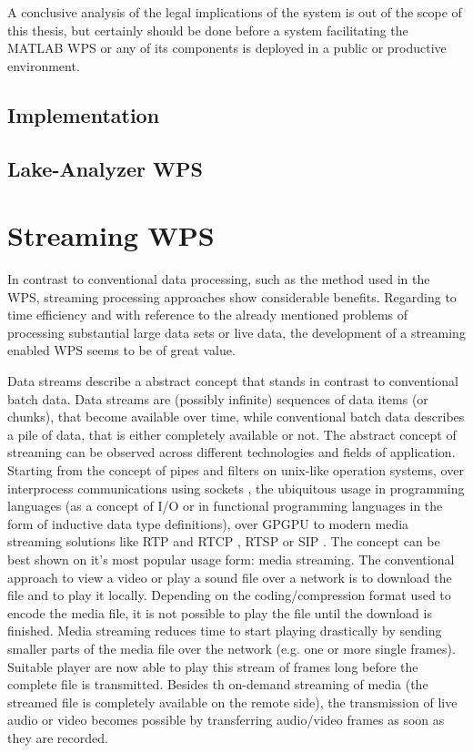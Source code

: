 		A conclusive analysis of the legal implications of the system is out of the scope of this thesis, but certainly should be done before a system facilitating the MATLAB WPS or any of its components is deployed in a public or productive environment.
	\section{Implementation}

	\section{Lake-Analyzer WPS}
\chapter{Streaming WPS}
	In contrast to conventional data processing, such as the method used in the \ac{WPS}, streaming processing approaches show considerable benefits. Regarding to time efficiency and with reference to the already mentioned problems of processing substantial large data sets or live data, the development of a streaming enabled \ac{WPS} seems to be of great value.

	Data streams describe a abstract concept that stands in contrast to conventional batch data. Data streams are (possibly infinite) sequences of data items (or chunks), that become available over time, while conventional batch data describes a pile of data, that is either completely available or not. The abstract concept of streaming can be observed across different technologies and fields of application. Starting from the concept of pipes and filters on unix-like operation systems, over interprocess communications using sockets \citep[either local or over a network,][]{buschmann1996pattern}, the ubiquitous usage in programming languages (as a concept of I/O or in functional programming languages in the form of inductive data type definitions), over \ac{GPGPU} to modern media streaming solutions like RTP and RTCP \citep{ietf:rfc3550}, RTSP \citep{ietf:rfc2326} or SIP \citep{ietf:rfc3261}.
	The concept can be best shown on it's most popular usage form: media streaming. The conventional approach to view a video or play a sound file over a network is to download the file and to play it locally. Depending on the coding/compression format used to encode the media file, it is not possible to play the file until the download is finished. Media streaming reduces time to start playing drastically by sending smaller parts of the media file over the network (e.g. one or more single frames). Suitable player are now able to play this stream of frames long before the complete file is transmitted. Besides th on-demand streaming of media (the streamed file is completely available on the remote side), the transmission of live audio or video becomes possible by transferring audio/video frames as soon as they are recorded.

